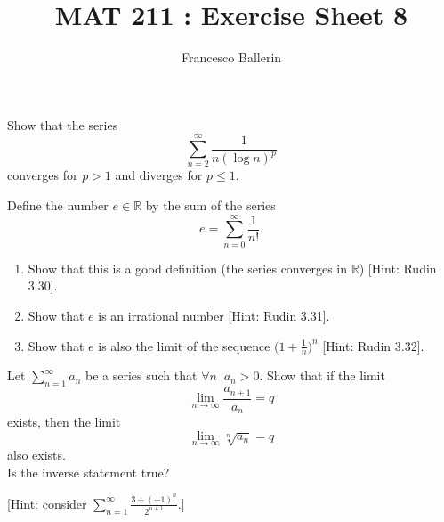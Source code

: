 \documentclass[11pt]{article}%
\title{MAT 211 : Exercise Sheet 8}
\author{Francesco Ballerin}
\date{\color{gray}{\small{francesco.ballerin@uib.no}}}
\begin{document}
\begin{minipage}[t]{\dimexpr \textwidth-6cm-\columnsep}
     \maketitle
\end{minipage}
\hfill\noindent{}

\vspace{50pt}



\begin{Exercise}[title=**] Show that the series 
$$
\sum_{n=2}^{\infty}\frac{1}{n(\log n)^p} 
$$
converges for $p>1$ and diverges for $p\leq 1$.
\end{Exercise}



\newpage
\begin{Exercise}[title={**}] Define the number $e\in \mathbb R$ by the sum of the series
	$$
	e=\sum_{n=0}^{\infty}\frac{1}{n!}.
	$$
	\begin{enumerate}
		\item Show that this is a good definition (the series converges in $\mathbb{R}$) [Hint: Rudin 3.30].
		\item {Show that $e$ is an irrational number [Hint: Rudin 3.31].}
		\item {Show that $e$ is also the limit of the sequence $\Big(1+\frac{1}{n}\Big)^n$ [Hint: Rudin 3.32].}
	\end{enumerate}
	
\end{Exercise}

\begin{Exercise}[title=**] Let $\sum_{n=1}^{\infty} a_n$ be a series such that $\forall n\;\; a_n>0$. Show that if the limit \begin{equation*}\label{A}\lim\limits_{n\to\infty}\frac{a_{n+1}}{a_n}=q\end{equation*} exists, then the limit \begin{equation*}\label{B}\lim\limits_{n\to\infty}\sqrt[n]{a_n}=q\end{equation*} also exists.\\ Is the inverse statement true?
	\bigskip
	
	[Hint: consider $\sum_{n=1}^{\infty}\frac{3+(-1)^n}{2^{n+1}}$.]
\end{Exercise}
\end{document}

